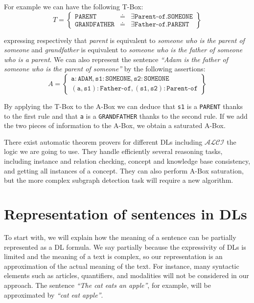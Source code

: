 \documentclass{esslli}
\newcommand{\dl}[1]{\texttt{#1}}
\newcommand{\dd}{{:}}
\begin{document}
For example we can have the following T-Box:
$$
T = \left\{
\begin{array}{rcl}
 \dl{PARENT} &\doteq& \exists\dl{Parent-of}.\dl{SOMEONE}\\
 \dl{GRANDFATHER} &\doteq& \exists\dl{Father-of}.\dl{PARENT}
\end{array}
\right\}$$

\noindent
expressing respectively that \emph{parent} is equivalent to \emph{someone who is
the parent of someone} and \emph{grandfather} is equivalent to \emph{someone who is
the father of someone who is a parent}. We can also represent the
sentence \emph{``Adam is the father of someone who is the parent of
  someone''} by the following assertions:
$$
A = \left\{
\begin{array}{c}
 \dl{a} \dd \dl{ADAM}, \dl{s1} \dd \dl{SOMEONE}, \dl{s2} \dd \dl{SOMEONE}\\
 (\dl{a},\dl{s1}) \dd \dl{Father-of}, (\dl{s1},\dl{s2}) \dd \dl{Parent-of}
\end{array}
\right\}$$

\noindent
By applying the T-Box to the A-Box we can deduce that \dl{s1} is a
\dl{PARENT} thanks to the first rule and that \dl{a} is a
\dl{GRANDFATHER} thanks to the second rule. If we add the two pieces
of information to the A-Box, we obtain a saturated A-Box.

There exist automatic theorem provers for different DLs including
$\mathcal{ALCI}$ the logic we are going to use. They handle
efficiently several reasoning tasks, including instance and relation
checking, concept and knowledge base consistency, and getting all
instances of a concept. They can also perform A-Box saturation, but
the more complex subgraph detection task will require a new algorithm.


\section{Representation of sentences in DLs}

To start with, we will explain how the meaning of a sentence can be
partially represented as a DL formula. We say partially because the
expressivity of DLs is limited and the meaning of a text is complex,
so our representation is an approximation of the actual meaning of the
text. For instance, many syntactic elements such as articles,
quantifiers, and modalities will not be considered in
our approach. The sentence \emph{``The cat eats an apple''}, for
example, will be approximated by \emph{``cat eat apple''}.
\end{document}

